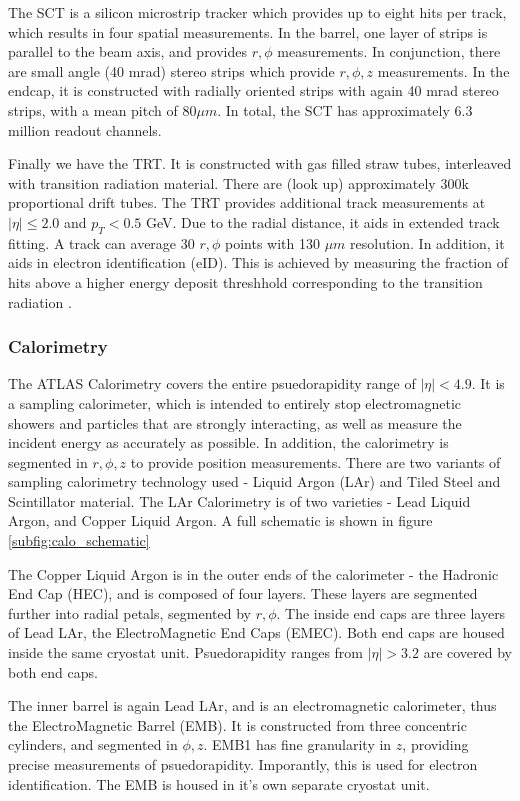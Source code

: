\documentclass[12pt]{article}
\begin{document}
The SCT is a silicon microstrip tracker which provides up to eight hits per
track, which results in four spatial measurements. In the barrel, one layer of
strips is parallel to the beam axis, and provides $r,\phi$ measurements. In
conjunction, there are small angle (40 mrad) stereo strips which provide
$r,\phi,z$ measurements. In the endcap, it is constructed with radially oriented
strips with again 40 mrad stereo strips, with a mean pitch of $80 \mu m$. In
total, the SCT has approximately 6.3 million readout channels.

Finally we have the TRT. It is constructed with gas filled straw tubes,
interleaved with transition radiation material. There are (look up)
approximately 300k proportional drift tubes. The TRT provides additional track
measurements at $|\eta| \leq 2.0$ and $p_T<0.5$ GeV. Due to the radial distance,
it aids in extended track fitting. A track can average 30 $r,\phi$ points with
130 $\mu m$ resolution. In addition, it aids in electron identification (eID).
This is achieved by measuring the fraction of hits above a higher energy deposit
threshhold corresponding to the transition radiation \cite{Aad_2024}.

\subsubsection{Calorimetry}

The ATLAS Calorimetry covers the entire psuedorapidity range of $|\eta| < 4.9$.
It is a sampling calorimeter, which is intended to entirely stop electromagnetic
showers and particles that are strongly interacting, as well as measure the
incident energy as accurately as possible. In addition, the calorimetry is
segmented in $r, \phi, z$ to provide position measurements. There are two
variants of sampling calorimetry technology used - Liquid Argon (LAr) and Tiled
Steel and Scintillator material. The LAr Calorimetry is of two varieties - Lead
Liquid Argon, and Copper Liquid Argon. A full schematic is shown in figure
\ref{subfig:calo_schematic}

The Copper Liquid Argon is in the outer ends of the calorimeter - the Hadronic
End Cap (HEC), and is composed of four layers. These layers are segmented
further into radial petals, segmented by $r,\phi$. The inside end caps are three
layers of Lead LAr, the ElectroMagnetic End Caps (EMEC). Both end caps are
housed inside the same cryostat unit. Psuedorapidity ranges from $|\eta|>3.2$
are covered by both end caps.

The inner barrel is again Lead LAr, and is an electromagnetic calorimeter, thus
the ElectroMagnetic Barrel (EMB). It is constructed from three concentric
cylinders, and segmented in $\phi, z$. EMB1 has fine granularity in $z$,
providing precise measurements of psuedorapidity. Imporantly, this is used for
electron identification. The EMB is housed in it's own separate cryostat unit.
\end{document}
